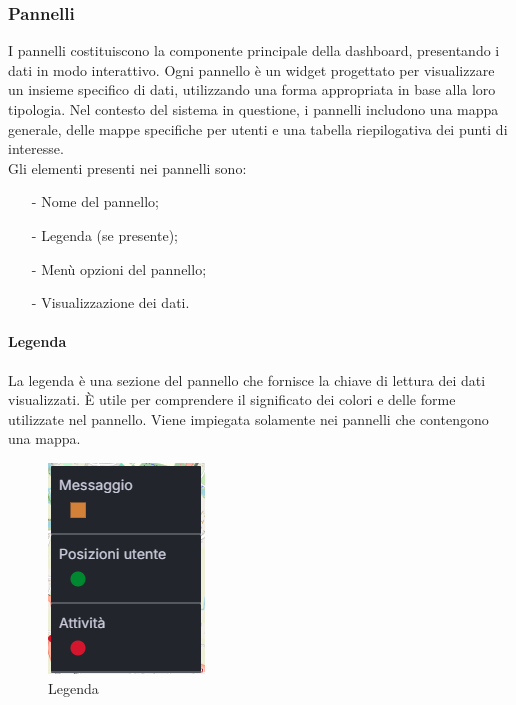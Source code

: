 \documentclass[10pt]{article}
\begin{document}
\begin{justify}
    \subsubsection{Pannelli}
    I pannelli costituiscono la componente principale della dashboard, presentando i dati in modo interattivo. Ogni pannello è un widget progettato per visualizzare un insieme specifico di dati, utilizzando una forma appropriata in base alla loro tipologia. Nel contesto del sistema in questione, i pannelli includono una mappa generale, delle mappe specifiche per utenti e una tabella riepilogativa dei punti di interesse.\\
    Gli elementi presenti nei pannelli sono:
    \begin{itemize}
        \item[-] Nome del pannello;
        \item[-] Legenda (se presente);
        \item[-] Menù opzioni del pannello;
        \item[-] Visualizzazione dei dati.
    \end{itemize}

    \paragraph{Legenda}
    La legenda è una sezione del pannello che fornisce la chiave di lettura dei dati visualizzati. È utile per comprendere il significato dei colori e delle forme utilizzate nel pannello. Viene impiegata solamente nei pannelli che contengono una mappa.
    \begin{figure}[H]
    \centering
    \includegraphics[width=0.25\linewidth]{legenda.png}
    \caption{Legenda}
    \end{figure}


\end{justify}
\end{document}
